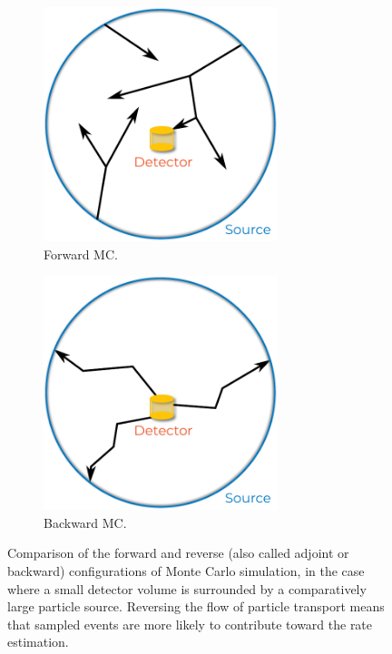 \begin{figure}
    \centering
    \begin{subfigure}[t]{0.49\textwidth}
        \centering
        \includegraphics[width=0.75\textwidth]{chapter5/bmc_setup.pdf}
        \caption{Forward MC.}
    \end{subfigure}
    \hfill
    \begin{subfigure}[t]{0.49\textwidth}
        \centering
        \includegraphics[width=0.75\textwidth]{chapter5/bmc_setup_backward.pdf}
        \caption{Backward MC.}
    \end{subfigure}
    \caption{
        Comparison of the forward and reverse (also called adjoint or backward)
        configurations of Monte Carlo simulation, in the case where a small
        detector volume is surrounded by a comparatively large particle source.
        Reversing the flow of particle transport means that sampled events are
        more likely to contribute toward the rate estimation.
    }
    \label{fig:bmc_configuration}
\end{figure}


